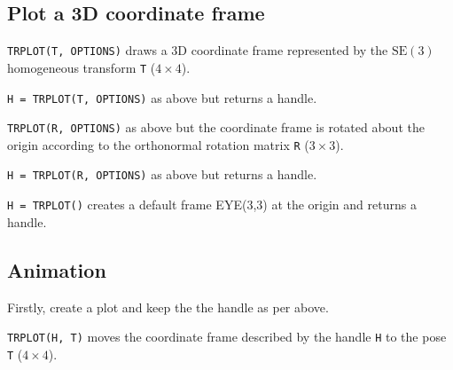 \subsection*{Plot a 3D coordinate frame}


\texttt{TRPLOT(T, OPTIONS)} draws a 3D coordinate frame represented by the $\mbox{SE}(3)$ homogeneous
transform \texttt{T} ($4 \times 4$).



\texttt{H = TRPLOT(T, OPTIONS)} as above but returns a handle.



\texttt{TRPLOT(R, OPTIONS)} as above but the coordinate frame is rotated about the
origin according to the orthonormal rotation matrix \texttt{R} ($3 \times 3$).



\texttt{H = TRPLOT(R, OPTIONS)} as above but returns a handle.



\texttt{H = TRPLOT()} creates a default frame EYE(3,3) at the origin and returns a
handle.


\subsection*{Animation}


Firstly, create a plot and keep the the handle as per above.



\texttt{TRPLOT(H, T)} moves the coordinate frame described by the handle \texttt{H} to
the pose \texttt{T} ($4 \times 4$).


